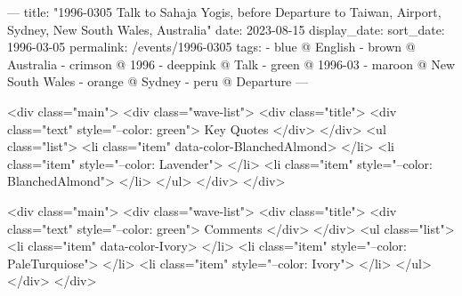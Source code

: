 ---
title: "1996-0305 Talk to Sahaja Yogis, before Departure to Taiwan, Airport, Sydney, New South Wales, Australia"
date: 2023-08-15
display_date: 
sort_date: 1996-03-05
permalink: /events/1996-0305
tags:
  - blue @ English
  - brown @ Australia
  - crimson @ 1996
  - deeppink @ Talk
  - green @ 1996-03
  - maroon @ New South Wales
  - orange @ Sydney
  - peru @ Departure
---

<div class="main">
  <div class="wave-list">
    <div class="title">
      <div class="text" style="--color: green">
        Key Quotes
      </div>
    </div>
    <ul class="list">
        <li class="item" data-color-BlanchedAlmond>
        </li>
        <li class="item" style="--color: Lavender">
        </li>
        <li class="item" style="--color: BlanchedAlmond">
        </li>
      </ul>
  </div>
</div>

<div class="main">
  <div class="wave-list">
    <div class="title">
      <div class="text" style="--color: green">
        Comments
      </div>
    </div>
    <ul class="list">
        <li class="item" data-color-Ivory>
        </li>
        <li class="item" style="--color: PaleTurquiose">
        </li>
        <li class="item" style="--color: Ivory">
        </li>
      </ul>
  </div>
</div>